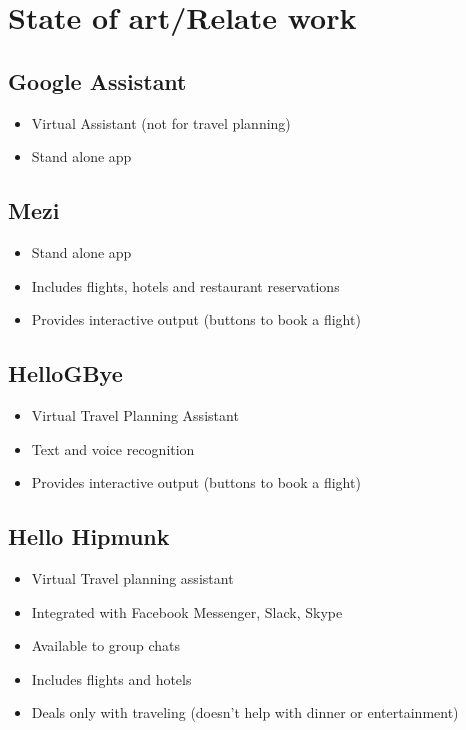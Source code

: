 \documentclass[runningheads,a4paper,11pt]{report}
\begin{document}
		
\chapter{State of art/Relate work}
\label{chapter:stateOfArt}
\section*{Google Assistant}
\begin{itemize}
	\item Virtual Assistant (not for travel planning)
	\item Stand alone app
\end{itemize} 

\section*{Mezi}
\begin{itemize}
	\item Stand alone app
	\item Includes flights, hotels and restaurant reservations	
	\item Provides interactive output (buttons to book a flight)
\end{itemize}

\section*{HelloGBye}
\begin{itemize}
\item Virtual Travel Planning Assistant
\item Text and voice recognition	
\item Provides interactive output (buttons to book a flight)
\end{itemize}

\section*{Hello Hipmunk}
\begin{itemize}
	\item Virtual Travel planning assistant
	\item Integrated with Facebook Messenger, Slack, Skype
	\item Available to group chats
	\item Includes flights and hotels
	\item Deals only with traveling (doesn't help with dinner or entertainment)
\end{itemize}
\end{document}
